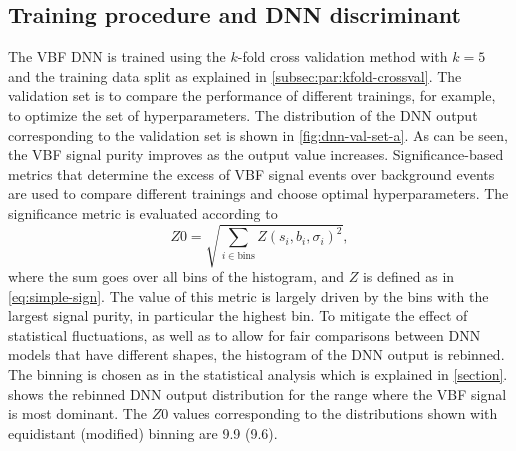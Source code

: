 \subsection{Training procedure and DNN discriminant}
\label{subsec:performance-metrics}
The VBF DNN is trained using the $k$-fold cross validation method with $k=5$ and the training data split as explained in \cref{subsec:par:kfold-crossval}.
The validation set is to compare the performance of different trainings, for example, to optimize the set of hyperparameters.
The distribution of the DNN output corresponding to the validation set is shown in \cref{fig:dnn-val-set-a}.
As can be seen, the VBF signal purity improves as the output value increases.
Significance-based metrics that determine the excess of VBF signal events over background events are used to compare different trainings and choose optimal hyperparameters.
The significance metric is evaluated according to
\begin{equation}
    \label{eq:significance-performance-metric}
    Z0 = \sqrt{ \sum_{i \in \text{bins}} Z(s_{i}, b_{i}, \sigma_{i})^2 },
\end{equation}
where the sum goes over all bins of the histogram, and $Z$ is defined as in \cref{eq:simple-sign}.
The value of this metric is largely driven by the bins with the largest signal purity, in particular the highest bin.
To mitigate the effect of statistical fluctuations, as well as to allow for fair comparisons between DNN models that have different shapes, the histogram of the DNN output is rebinned. The binning is chosen as in the statistical analysis which is explained in \cref{section}.  shows the rebinned DNN output distribution for the range where the VBF signal is most dominant. The $Z0$ values corresponding to the distributions shown with equidistant (modified) binning are 9.9 (9.6). 


